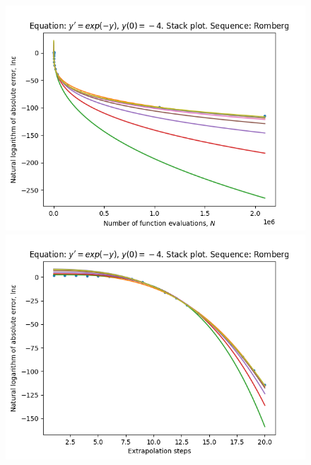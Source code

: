 \begin{figure}[H]
\centering
\begin{minipage}{0.45\textwidth}
\centering
\includegraphics[scale=0.45]{../results/emr_plots/ln_em4_hp_romberg_stack.png}
\end{minipage}
\begin{minipage}{0.45\textwidth}
\centering
\includegraphics[scale=0.45]{../results/emr_plots/ln_em4_hp_romberg_steps_stack.png}
\end{minipage}
\end{figure}

